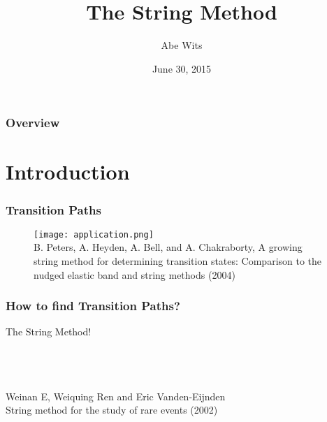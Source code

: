 \documentclass{beamer}
\title[String Method]{The String Method} %
\author{Abe Wits}
\institute[UU]
{
Utrecht University\\
\medskip
\textit{A.J.G.Wits@uu.nl}
}
\date{June 30, 2015}
\renewcommand{\(}{\left(}
\renewcommand{\)}{\right)}
\begin{document}
\begin{frame}
\titlepage
\end{frame}

\begin{frame}
\frametitle{Overview}
\tableofcontents
\end{frame}

\section{Introduction}

\begin{frame}
\frametitle{Transition Paths}

\begin{figure}
\texttt{[image: application.png]}\\
{\tiny B. Peters, A. Heyden, A. Bell, and A. Chakraborty, A growing string method for determining transition states: Comparison to the nudged elastic band and string methods (2004)}
\end{figure}


\end{frame}

\begin{frame}
\frametitle{How to find Transition Paths?}
\begin{center}
{\Large The String Method!}
\end{center}
~\\
~\\
~\\
Weinan E, Weiquing Ren and Eric Vanden-Eijnden\\
String method for the study of rare events (2002)
\end{frame}
\end{document}
